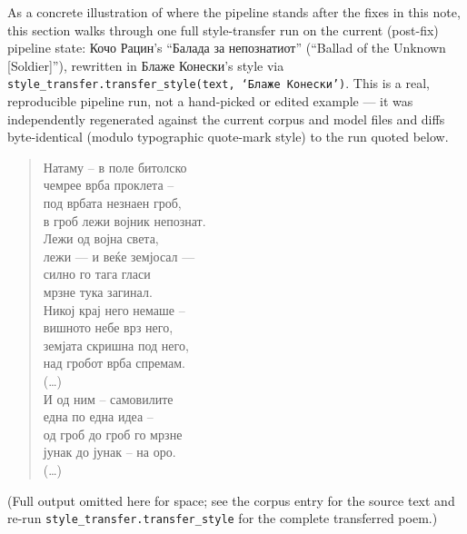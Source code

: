 \documentclass[11pt]{article}
\begin{document}
As a concrete illustration of where the pipeline stands after the fixes in
this note, this section walks through one full style-transfer run on the
current (post-fix) pipeline state: Кочо Рацин's ``Балада за непознатиот''
(``Ballad of the Unknown [Soldier]''), rewritten in Блаже Конески's style
via \texttt{style\_transfer.transfer\_style(text, `Блаже Конески')}. This is
a real, reproducible pipeline run, not a hand-picked or edited example — it
was independently regenerated against the current corpus and model files
and diffs byte-identical (modulo typographic quote-mark style) to the run
quoted below.

\begin{quote}
\small
\ttfamily
Натаму – в поле битолско\\
чемрее врба проклета –\\
под врбата незнаен гроб,\\
в гроб лежи војник непознат.\\[0.3em]
Лежи од војна света,\\
лежи — и веќе земјосал —\\
силно го тага гласи\\
мрзне тука загинал.\\[0.3em]
Никој крај него немаше –\\
вишното небе врз него,\\
земјата скришна под него,\\
над гробот врба спремам.\\[0.3em]
{\normalfont(\dots)}\\[0.3em]
И од ним – самовилите\\
една по една идеа –\\
од гроб до гроб го мрзне\\
јунак до јунак – на оро.\\[0.3em]
{\normalfont(\dots)}
\end{quote}

(Full output omitted here for space; see the corpus entry for the source
text and re-run \texttt{style\_transfer.transfer\_style} for the complete
transferred poem.)
\end{document}
